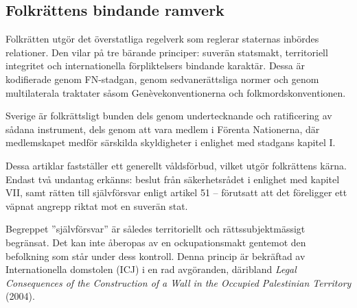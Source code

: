 
\subsection{Folkrättens bindande ramverk}

Folkrätten utgör det överstatliga regelverk som reglerar staternas inbördes relationer. Den vilar på tre bärande principer: suverän statsmakt, territoriell integritet och internationella förpliktelsers bindande karaktär. Dessa är kodifierade genom FN-stadgan, genom sedvanerättsliga normer och genom multilaterala traktater såsom Genèvekonventionerna och folkmordskonventionen.

Sverige är folkrättsligt bunden dels genom undertecknande och ratificering av sådana instrument, dels genom att vara medlem i Förenta Nationerna, där medlemskapet medför särskilda skyldigheter i enlighet med stadgans kapitel I.



Dessa artiklar fastställer ett generellt våldsförbud, vilket utgör folkrättens kärna. Endast två undantag erkänns: beslut från säkerhetsrådet i enlighet med kapitel VII, samt rätten till självförsvar enligt artikel 51 – förutsatt att det föreligger ett väpnat angrepp riktat mot en suverän stat.


Begreppet ”självförsvar” är således territoriellt och rättssubjektmässigt begränsat. Det kan inte åberopas av en ockupationsmakt gentemot den befolkning som står under dess kontroll. Denna princip är bekräftad av Internationella domstolen (ICJ) i en rad avgöranden, däribland \textit{Legal Consequences of the Construction of a Wall in the Occupied Palestinian Territory} (2004).

\medskip

